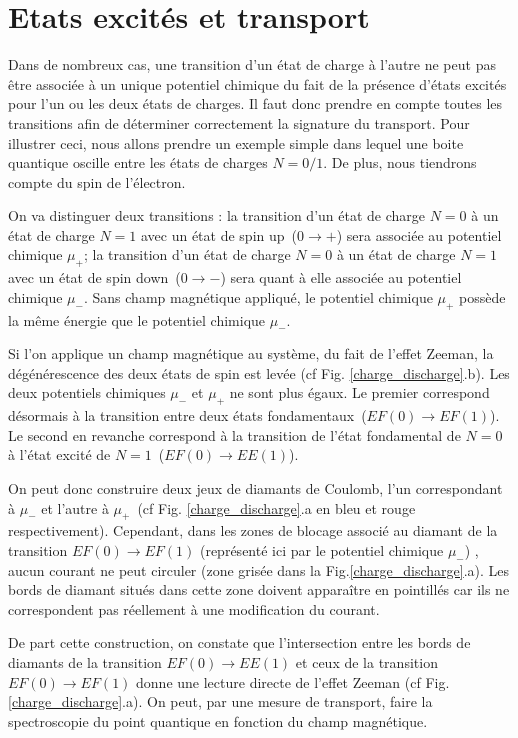 \section{Etats excités et transport}

Dans de nombreux cas, une transition d'un état de charge à l'autre ne peut pas être associée à un unique potentiel chimique du fait de la présence d'états excités pour l'un ou les deux états de charges. Il faut donc prendre en compte toutes les transitions afin de déterminer correctement la signature du transport. Pour illustrer ceci, nous allons prendre un exemple simple dans lequel une boite quantique oscille entre les états de charges $N=0/1$. De plus, nous tiendrons compte du spin de l'électron. 

On va distinguer deux transitions : la transition d'un état de charge $N=0$ à un état de charge $N=1$ avec un état de spin up~($0\rightarrow +$) sera associée au potentiel chimique $\mu_{+}$; la transition d'un état de charge $N=0$ à un état de charge $N=1$ avec un état de spin down~($0\rightarrow -$) sera quant à elle associée au potentiel chimique $\mu_{-}$. Sans champ magnétique appliqué, le potentiel chimique $\mu_{+}$ possède la m\^eme énergie que le potentiel chimique  $\mu_{-}$.

Si l'on applique un champ magnétique au système, du fait de l'effet Zeeman, la dégénérescence des deux états de spin est levée (cf Fig. \ref{charge_discharge}.b). Les deux potentiels chimiques $\mu_{-}$ et $\mu_{+}$ ne sont plus égaux. Le premier correspond désormais à la transition entre deux états fondamentaux~($EF(0)\rightarrow EF(1)$). Le second en revanche correspond à la transition de l'état fondamental de $N=0$ à l'état excité de $N=1$~($EF(0)\rightarrow EE(1)$).

On peut donc construire deux jeux de diamants de Coulomb, l'un correspondant à $\mu_{-}$ et l'autre à $\mu_{+}$~(cf Fig. \ref{charge_discharge}.a en bleu et rouge respectivement). Cependant, dans les zones de blocage associé au diamant de la transition $EF(0)\rightarrow EF(1)$ (représenté ici par le potentiel chimique $\mu_{-}$) , aucun courant ne peut circuler (zone grisée dans la Fig.\ref{charge_discharge}.a). Les bords de diamant situés dans cette zone doivent apparaître en pointillés car ils ne correspondent pas réellement à une modification du courant.

De part cette construction, on constate que l'intersection entre les bords de diamants de la transition $EF(0)\rightarrow EE(1)$ et ceux de la transition $EF(0)\rightarrow EF(1)$ donne une lecture directe de l'effet Zeeman (cf Fig. \ref{charge_discharge}.a). On peut, par une mesure de transport, faire la spectroscopie du point quantique en fonction du champ magnétique.

